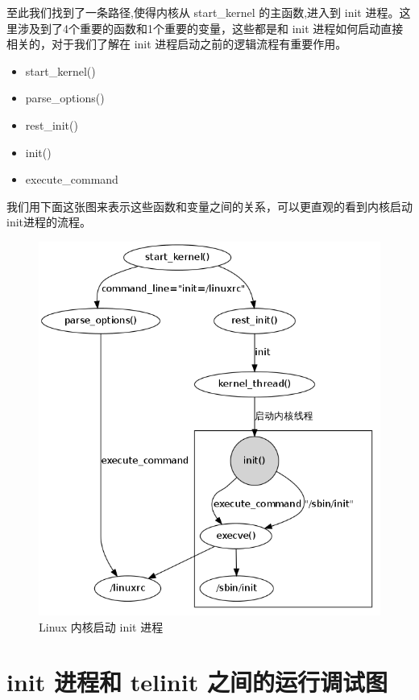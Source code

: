 至此我们找到了一条路径,使得内核从 start\_kernel 的主函数,进入到 init
进程。这里涉及到了4个重要的函数和1个重要的变量，这些都是和 init
进程如何启动直接相关的，对于我们了解在 init
进程启动之前的逻辑流程有重要作用。

\begin{itemize}
\item
  start\_kernel()
\item
  parse\_options()
\item
  rest\_init()
\item
  init()
\item
  execute\_command
\end{itemize}
我们用下面这张图来表示这些函数和变量之间的关系，可以更直观的看到内核启动init进程的流程。

\begin{figure}[htbp]
\centering
\includegraphics{./figures/kernel2init.png}
\caption{Linux 内核启动 init 进程}
\end{figure}

\section{init 进程和 telinit 之间的运行调试图}

